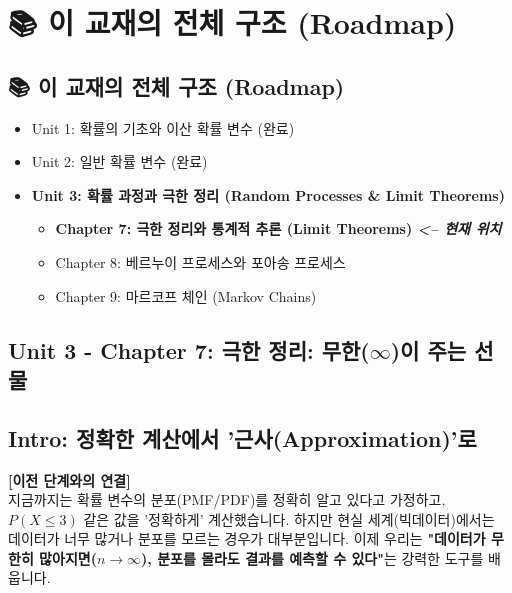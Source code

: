 \documentclass[11pt,a4paper]{book}
\newcommand{\chaptertitle}[2]{\section*{#1: #2}}
\theoremstyle{definition}
\begin{document}
\chapter{📚 이 교재의 전체 구조 (Roadmap)}
\label{ch:lecture7}



\section*{📚 이 교재의 전체 구조 (Roadmap)}
\begin{itemize}
    \item Unit 1: 확률의 기초와 이산 확률 변수 (완료)
    \item Unit 2: 일반 확률 변수 (완료)
    \item \textbf{Unit 3: 확률 과정과 극한 정리 (Random Processes \& Limit Theorems)}
    \begin{itemize}
        \item[$\to$] \textbf{\textcolor{mainblue}{Chapter 7: 극한 정리와 통계적 추론 (Limit Theorems) \textit{<-- 현재 위치}}}
        \item Chapter 8: 베르누이 프로세스와 포아송 프로세스
        \item Chapter 9: 마르코프 체인 (Markov Chains)
    \end{itemize}
\end{itemize}
\vspace{1cm}

\chaptertitle{Unit 3 - Chapter 7}{극한 정리: 무한($\infty$)이 주는 선물}

\section*{Intro: 정확한 계산에서 '근사(Approximation)'로}

\textbf{[이전 단계와의 연결]} \\
지금까지는 확률 변수의 분포(PMF/PDF)를 정확히 알고 있다고 가정하고, $P(X \le 3)$ 같은 값을 '정확하게' 계산했습니다.
하지만 현실 세계(빅데이터)에서는 데이터가 너무 많거나 분포를 모르는 경우가 대부분입니다.
이제 우리는 \textbf{"데이터가 무한히 많아지면($n \to \infty$), 분포를 몰라도 결과를 예측할 수 있다"}는 강력한 도구를 배웁니다.
\end{document}
